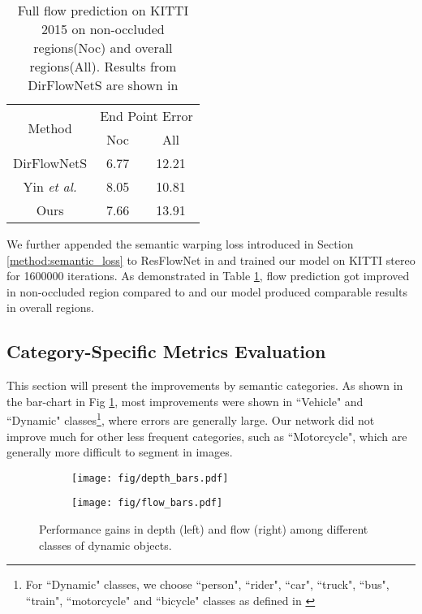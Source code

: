 \documentclass[10pt,twocolumn]{article}
\begin{document}
\begin{table}[H]\centering
\begin{tabular}{ c || c c }
 \hline
    \multirow{2}{*}{Method}&
  \multicolumn{2}{c}{End Point Error}\\
   &  Noc & All\\
   \hline
  DirFlowNetS & 6.77 & 12.21 \\
 \hline
  Yin \textit{et al.} \cite{yin2018geonet} & 8.05 & 10.81 \\
  \hline
  Ours   & 7.66 & 13.91 \\
 \hline
\end{tabular}
\caption{Full flow prediction on KITTI 2015 on non-occluded regions(Noc) and overall regions(All). Results from DirFlowNetS are shown in \cite{yin2018geonet}}\label{tab:flow_standard}
\end{table}
We further appended the semantic warping loss introduced in Section \ref{method:semantic_loss} to ResFlowNet in \cite{yin2018geonet} and trained our model on KITTI stereo for 1600000 iterations. As demonstrated in Table \ref{tab:flow_standard}, flow prediction got improved in non-occluded region compared to  \cite{yin2018geonet} and our model produced comparable results in overall regions. 


\subsection{Category-Specific Metrics Evaluation}
This section will present the improvements by semantic categories. As shown in the bar-chart in Fig \ref{fig:class-eval}, most improvements were shown in ``Vehicle" and ``Dynamic" classes\footnote{For ``Dynamic" classes, we choose ``person", ``rider", ``car", ``truck", ``bus", ``train", ``motorcycle" and ``bicycle" classes as defined in \cite{cordts2016cityscapes}}, where errors are generally large. Our network did not improve much for other less frequent categories, such as ``Motorcycle", which are generally more difficult to segment in images.

\begin{figure}
    \centering
         \begin{subfigure}[b]{0.49\linewidth}
       \texttt{[image: fig/depth\_bars.pdf]}
     \end{subfigure}
     \begin{subfigure}[b]{0.49\linewidth}
       \texttt{[image: fig/flow\_bars.pdf]}
     \end{subfigure}
\caption{Performance gains in depth (left) and flow (right) among different classes of dynamic objects.}
    \label{fig:class-eval}
    
\end{figure} 
\end{document}
